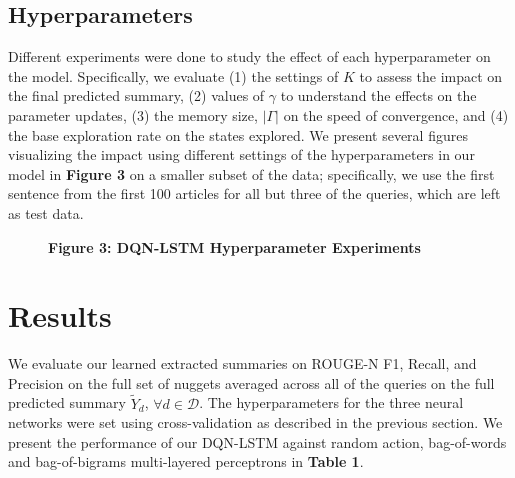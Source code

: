 \documentclass[12pt]{article}
\begin{document}
\subsection{Hyperparameters}
Different experiments were done to study the effect of each hyperparameter on the model.  Specifically, we evaluate (1) the settings of $K$ to assess the impact on the final predicted summary, (2) values of $\gamma$ to understand the effects on the parameter updates, (3) the memory size, $ | \Gamma |$ on the speed of convergence, and (4) the base exploration rate on the states explored. We present several figures visualizing the impact using different settings of the hyperparameters in our model in \textbf{Figure 3} on a smaller subset of the data; specifically, we use the first sentence from the first 100 articles for all but three of the queries, which are left as test data. 

\begin{figure}[h]
    \centering
    \captionsetup{labelformat=empty}
    \caption{\textbf{Figure 3: DQN-LSTM Hyperparameter Experiments}}
\end{figure}

\section{Results}
We evaluate our learned extracted summaries on ROUGE-N F1, Recall, and Precision on the full set of nuggets averaged across all of the queries on the full predicted summary $\tilde{Y}_d$, $\forall d \in \mathcal{D}$. The hyperparameters for the three neural networks were set using cross-validation as described in the previous section. We present the performance of our DQN-LSTM against random action, bag-of-words and bag-of-bigrams multi-layered perceptrons in \textbf{Table 1}. 
\end{document}
